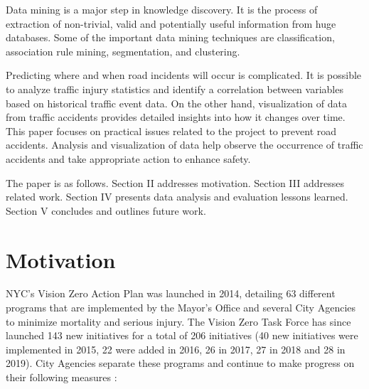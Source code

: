 \documentclass[conference]{IEEEtran}
\begin{document}
Data mining is a major step in knowledge discovery.  It is the process of extraction of non-trivial, valid and potentially useful information from huge databases. Some of the important data mining techniques are classification, association rule mining, segmentation, and clustering. 

Predicting where and when road incidents will occur is complicated. It is possible to analyze traffic injury statistics and identify a correlation between variables based on historical traffic event data. On the other hand, visualization of data from traffic accidents provides detailed insights into how it changes over time. This paper focuses on practical issues related to the project to prevent road accidents. Analysis and visualization of data help observe the occurrence of traffic accidents and take appropriate action to enhance  safety.   

The paper is as follows. Section II addresses motivation. Section III addresses related work. Section IV presents data analysis and evaluation lessons learned. Section V concludes and outlines future work. 

\section{Motivation}
NYC’s Vision Zero Action Plan was launched in 2014, detailing 63 different programs that are implemented by the Mayor's Office and several City Agencies to minimize mortality and serious injury. The Vision Zero Task Force has since launched 143 new initiatives for a total of 206 initiatives (40 new initiatives were implemented in 2015, 22 were added in 2016, 26 in 2017, 27 in 2018 and 28 in 2019).  City Agencies separate these programs and continue to make progress on their following measures \cite{VisionZeroInitiative}:     
\end{document}

